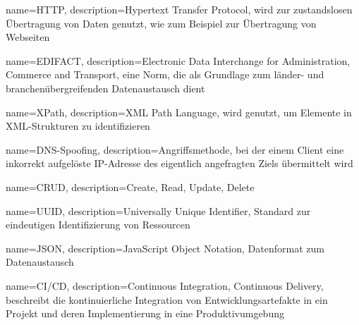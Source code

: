 {
    name=HTTP,
    description={Hypertext Transfer Protocol, wird zur zustandslosen Übertragung von Daten
    genutzt, wie zum Beispiel zur Übertragung von Webseiten}
}

{
    name=EDIFACT,
    description={Electronic Data Interchange for Administration, Commerce and Transport,
    eine Norm, die als Grundlage zum länder- und branchenübergreifenden Datenaustausch dient}
}

{
    name=XPath,
    description={XML Path Language, wird genutzt, um Elemente in XML-Strukturen zu identifizieren}
}

{
    name=DNS-Spoofing,
    description={Angriffsmethode, bei der einem Client eine inkorrekt aufgelöste IP-Adresse des eigentlich
    angefragten Ziels übermittelt wird}
}

{
    name=CRUD,
    description={Create, Read, Update, Delete}
}

{
    name=UUID,
    description={Universally Unique Identifier, Standard zur eindeutigen Identifizierung
    von Ressourcen}
}


{
    name=JSON,
    description={JavaScript Object Notation, Datenformat zum Datenaustausch}
}

{
    name=CI/CD,
    description={Continuous Integration, Continuous Delivery, beschreibt die kontinuierliche
    Integration von Entwicklungsartefakte in ein Projekt und deren Implementierung in eine Produktivumgebung}
}
